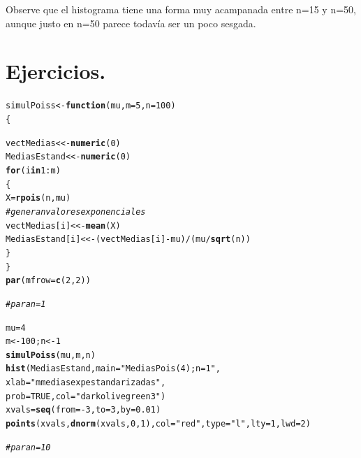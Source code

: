 \documentclass[12pt,letterpaper]{article}\usepackage[]{graphicx}\usepackage[]{color}
\makeatletter
\newcommand{\hlnum}[1]{\textcolor[rgb]{0.686,0.059,0.569}{#1}}%
\newcommand{\hlstr}[1]{\textcolor[rgb]{0.192,0.494,0.8}{#1}}%
\newcommand{\hlcom}[1]{\textcolor[rgb]{0.678,0.584,0.686}{\textit{#1}}}%
\newcommand{\hlopt}[1]{\textcolor[rgb]{0,0,0}{#1}}%
\newcommand{\hlstd}[1]{\textcolor[rgb]{0.345,0.345,0.345}{#1}}%
\newcommand{\hlkwa}[1]{\textcolor[rgb]{0.161,0.373,0.58}{\textbf{#1}}}%
\newcommand{\hlkwb}[1]{\textcolor[rgb]{0.69,0.353,0.396}{#1}}%
\newcommand{\hlkwc}[1]{\textcolor[rgb]{0.333,0.667,0.333}{#1}}%
\newcommand{\hlkwd}[1]{\textcolor[rgb]{0.737,0.353,0.396}{\textbf{#1}}}%
\newenvironment{kframe}{%
 \def\at@end@of@kframe{}%
 \ifinner\ifhmode%
  \def\at@end@of@kframe{\end{minipage}}%
  \begin{minipage}{\columnwidth}%
 \fi\fi%
 \def\FrameCommand##1{\hskip\@totalleftmargin \hskip-\fboxsep
 \colorbox{shadecolor}{##1}\hskip-\fboxsep
     \hskip-\linewidth \hskip-\@totalleftmargin \hskip\columnwidth}%
 \MakeFramed {\advance\hsize-\width
   \@totalleftmargin\z@ \linewidth\hsize
   \@setminipage}}%
 {\par\unskip\endMakeFramed%
 \at@end@of@kframe}
\newenvironment{knitrout}{}{} %
\makeatother
\begin{document}
\begin{enumerate}
\begin{knitrout}
\end{knitrout}

Observe que el histograma tiene una forma muy acampanada entre n=15 y n=50, aunque justo en n=50 parece todav\'ia ser un poco sesgada.\\

\section{Ejercicios.}
\begin{knitrout}
\color{fgcolor}\begin{kframe}
\begin{alltt}
\hlstd{simulPoiss} \hlkwb{<-} \hlkwa{function}\hlstd{(}\hlkwc{mu}\hlstd{,} \hlkwc{m}\hlstd{=}\hlnum{5}\hlstd{,} \hlkwc{n}\hlstd{=}\hlnum{100}\hlstd{)}
\hlstd{\{}

\hlstd{vectMedias} \hlkwb{<<-} \hlkwd{numeric}\hlstd{(}\hlnum{0}\hlstd{)}
\hlstd{MediasEstand} \hlkwb{<<-} \hlkwd{numeric}\hlstd{(}\hlnum{0}\hlstd{)}
\hlkwa{for} \hlstd{(i} \hlkwa{in} \hlnum{1}\hlopt{:}\hlstd{m)}
\hlstd{\{}
\hlstd{X} \hlkwb{=} \hlkwd{rpois}\hlstd{(n, mu)}
\hlcom{# genera n valores exponenciales }
\hlstd{vectMedias[i]} \hlkwb{<<-} \hlkwd{mean}\hlstd{(X)}
\hlstd{MediasEstand[i]} \hlkwb{<<-} \hlstd{(vectMedias[i]} \hlopt{-} \hlstd{mu)}\hlopt{/}\hlstd{(mu}\hlopt{/}\hlkwd{sqrt}\hlstd{(n))}
 \hlstd{\}}
\hlstd{\}}
\hlkwd{par}\hlstd{(}\hlkwc{mfrow}\hlstd{=}\hlkwd{c}\hlstd{(}\hlnum{2}\hlstd{,}\hlnum{2}\hlstd{))}

\hlcom{# para n=1 }

\hlstd{mu}\hlkwb{=}\hlnum{4}
\hlstd{m} \hlkwb{<-} \hlnum{100}\hlstd{; n} \hlkwb{<-} \hlnum{1}
\hlkwd{simulPoiss}\hlstd{(mu, m, n)}
\hlkwd{hist}\hlstd{(MediasEstand,} \hlkwc{main}\hlstd{=}\hlstr{"Medias Pois(4); n=1"}\hlstd{,}
     \hlkwc{xlab}\hlstd{=}\hlstr{"m medias exp estandarizadas"}\hlstd{,}
\hlkwc{prob}\hlstd{=}\hlnum{TRUE}\hlstd{,} \hlkwc{col}\hlstd{=}\hlstr{"darkolivegreen3"}\hlstd{)}
\hlstd{xvals} \hlkwb{=} \hlkwd{seq}\hlstd{(}\hlkwc{from}\hlstd{=}\hlopt{-}\hlnum{3}\hlstd{,} \hlkwc{to}\hlstd{=}\hlnum{3}\hlstd{,} \hlkwc{by}\hlstd{=}\hlnum{0.01}\hlstd{)}
\hlkwd{points}\hlstd{(xvals,} \hlkwd{dnorm}\hlstd{(xvals,} \hlnum{0}\hlstd{,} \hlnum{1}\hlstd{),} \hlkwc{col} \hlstd{=} \hlstr{"red"}\hlstd{,} \hlkwc{type}\hlstd{=}\hlstr{"l"}\hlstd{,} \hlkwc{lty}\hlstd{=}\hlnum{1}\hlstd{,} \hlkwc{lwd}\hlstd{=}\hlnum{2}\hlstd{)}

\hlcom{# para n=10}


\end{alltt}
\end{kframe}
\end{knitrout}
\end{enumerate}
\end{document}
